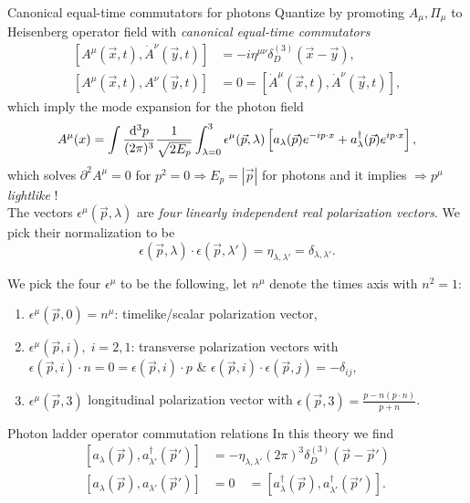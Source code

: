 \begin{mybox}{Canonical equal-time commutators for photons}
	Quantize by promoting $A_{\mu},\Pi_{\mu}$ to Heisenberg operator field with \emph{canonical equal-time commutators}
	\begin{align}
		\left[A^{\mu} (\vec{x},t) , \dot{A}^{\nu}(\vec{y},t)\right] &= - i \eta^{\mu \nu} \delta^{(3)}_D(\vec{x}-\vec{y}), \\
		\left[A^{\mu} (\vec{x},t), A^{\nu}(\vec{y},t)\right] &= 0= \left[\dot{A}^{\mu}(\vec{x},t), \dot{A}^{\nu}(\vec{y},t)\right],
	\end{align}
which imply the mode expansion for the photon field
\begin{equation}
	A^{\mu}(x) = \int \frac{\mathrm{d}^3 p}{(2 \pi)^3} \frac{1}{\sqrt{2 E_p}} \int_{\lambda=0}^{3} \epsilon^{\mu} (\vec{p},\lambda) \left[a_{\lambda}(\vec{p}) e^{-i p\cdot x} + a^{\dagger}_{\lambda} (\vec{p}) e^{ip\cdot x} \right],
\end{equation}
which solves $\partial^2 A^{\mu}=0$ for $p^2=0 \Rightarrow E_p = |\vec{p}|$ for photons and it implies $\Rightarrow p^{\mu}$\emph{ lightlike} !\\
The vectors $\epsilon^{\mu}(\vec{p},\lambda)$ are \emph{four linearly independent real polarization vectors}. We pick their normalization to be
\begin{equation}
	\epsilon(\vec{p},\lambda) \cdot \epsilon(\vec{p},\lambda') = \eta_{\lambda, \lambda'} = \delta_{\lambda,\lambda'}.
\end{equation}
\end{mybox}
We pick the four $\epsilon^{\mu}$ to be the following, let $n^{\mu}$ denote the times axis with $n^2 =1$: 
\begin{enumerate}
	\item $\epsilon^{\mu}(\vec{p},0)=n^{\mu}$: timelike/scalar polarization vector,
	\item $\epsilon^{\mu} (\vec{p}, i), \; i=2,1$: transverse polarization vectors with $\epsilon(\vec{p},i)\cdot n =0=\epsilon(\vec{p},i) \cdot p$ \& $\epsilon(\vec{p},i) \cdot \epsilon(\vec{p},j) = - \delta_{ij}$,
	\item $\epsilon^{\mu}(\vec{p},3)$ longitudinal polarization vector with $\epsilon(\vec{p},3) = \frac{p-n (p\cdot n)}{p+n}$.
\end{enumerate}
\begin{mybox}{Photon ladder operator commutation relations}
	In this theory we find 
	\begin{align}
		\left[a_{\lambda}(\vec{p}), a^{\dagger}_{\lambda'} (\vec{p}')\right] &= - \eta_{\lambda, \lambda'} (2 \pi)^3 \delta^{(3)}_D(\vec{p}-\vec{p}') \\
		\left[a_{\lambda}(\vec{p}), a_{\lambda'}(\vec{p}') \right] &= 0 \quad = \left[a^{\dagger}_{\lambda} (\vec{p}), a^{\dagger}_{\lambda '} (\vec{p}') \right].
	\end{align}
\end{mybox}
